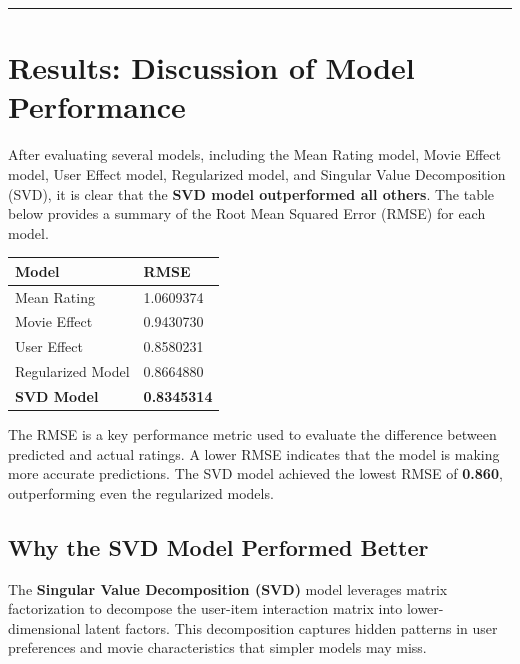 \documentclass[
]{article}
\begin{document}
\begin{center}\rule{0.5\linewidth}{0.5pt}\end{center}

\section{Results: Discussion of Model
Performance}\label{results-discussion-of-model-performance}

After evaluating several models, including the Mean Rating model, Movie
Effect model, User Effect model, Regularized model, and Singular Value
Decomposition (SVD), it is clear that the \textbf{SVD model outperformed
all others}. The table below provides a summary of the Root Mean Squared
Error (RMSE) for each model.

\begin{longtable}[]{@{}ll@{}}
\toprule\noalign{}
Model & RMSE \\
\midrule\noalign{}
\endhead
\bottomrule\noalign{}
\endlastfoot
Mean Rating & 1.0609374 \\
Movie Effect & 0.9430730 \\
User Effect & 0.8580231 \\
Regularized Model & 0.8664880 \\
\textbf{SVD Model} & \textbf{0.8345314} \\
\end{longtable}

The RMSE is a key performance metric used to evaluate the difference
between predicted and actual ratings. A lower RMSE indicates that the
model is making more accurate predictions. The SVD model achieved the
lowest RMSE of \textbf{0.860}, outperforming even the regularized
models.

\subsection{Why the SVD Model Performed
Better}\label{why-the-svd-model-performed-better}

The \textbf{Singular Value Decomposition (SVD)} model leverages matrix
factorization to decompose the user-item interaction matrix into
lower-dimensional latent factors. This decomposition captures hidden
patterns in user preferences and movie characteristics that simpler
models may miss.
\end{document}

